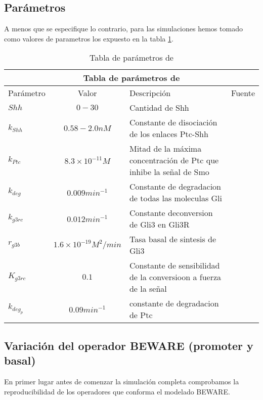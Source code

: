 \subsection{Parámetros}
A menos que se especifique lo contrario, para las simulaciones hemos tomado como valores de parametros los expuesto en la tabla \ref{tabla11}.
\begin{table}[h]
	\begin{center}
		
		\begin{tabular}{ |p{3cm}||c|p{3cm}|p{3cm}|  }
			\hline
			\multicolumn{4}{|c|}{Tabla de parámetros de \cite{schaffer}  } \\
			\hline
			Parámetro & Valor & Descripción & Fuente\\
			\hline
			$Shh $  & $0-30$    &\tiny{Cantidad de Shh} &   \cite{cambon1}\\
			$k_{Shh}$ &  $ 0.58-2.0nM$  & \tiny{Constante de disociación de los enlaces Ptc-Shh}   & \cite{cambon1}\\
			$k_{Ptc} $ & $8.3\times10^{-11}M$ & \tiny{ Mitad de la máxima concentración de Ptc que inhibe la señal de Smo } &  \cite{cambon1}\\
			$k_{deg}$   &$0.009min^{-1} $ & \tiny{ Constante de degradacion de todas las moleculas Gli } &  \cite{cambon1}\\
			
			$k_{g3rc}$ &  $0.012min^{-1}$  & \tiny{ Constante deconversion de Gli3 en Gli3R} & \cite{schaffer}\\
			$r_{g3b}$ & $1.6\times10^{-19}M^2/min$  & \tiny{ Tasa basal de sintesis de Gli3 }   & \cite{schaffer}\\
			$K_{g3rc}$ & $0.1$ & \tiny{ Constante de sensibilidad de la conversioon a fuerza de la señal }   & \cite{schaffer}\\
			
			$k_{deg_p}$& $0.09min^{-1} $ &  \tiny{constante de degradacion de Ptc} & \cite{cambon1}\\
			
			\hline
		\end{tabular}
		
	\end{center}
	\caption{Tabla de parámetros de \cite{schaffer} }\label{param_2}
	\label{tabla11}
\end{table}

\subsection{Variación del operador BEWARE (promoter y basal)}
En primer lugar antes de comenzar la simulación completa comprobamos la reproducibilidad de los operadores que conforma el modelado BEWARE. 

